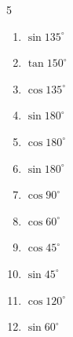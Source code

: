 \begin{multicols}{5}
\begin{enumerate}
        \phantom{$\displaystyle =-1$}

  \item $\displaystyle \sin{135^\circ}$


  \item $\displaystyle \tan{150^\circ}$


\columnbreak %

  \item $\displaystyle \cos{135^\circ}$


  \item $\displaystyle \sin{180^\circ}$

        \phantom{$\displaystyle =0$}

  \item $\displaystyle \cos{180^\circ}$

        \phantom{$\displaystyle =-1$}

  \item $\displaystyle \sin{180^\circ}$

        \phantom{$\displaystyle =0$}

  \item $\displaystyle \cos{90^\circ}$

        \phantom{$\displaystyle =0$}

  \item $\displaystyle \cos{60^\circ}$


  \item $\displaystyle \cos{45^\circ}$


  \item $\displaystyle \sin{45^\circ}$


  \item $\displaystyle \cos{120^\circ}$


  \item $\displaystyle \sin{60^\circ}$



\end{enumerate}
\end{multicols}
